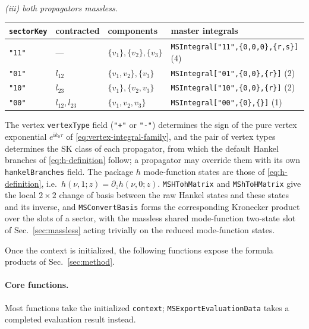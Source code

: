 \documentclass[11pt,a4paper]{article}
\newcommand{\ii}{\mathrm i}
\begin{document}
\begin{center}
\emph{(iii) both propagators massless.}\\[2pt]
\footnotesize\begin{tabular}{@{}lllp{5.8cm}@{}}
\toprule
\texttt{sectorKey} & contracted & components & master integrals\\
\midrule
\texttt{"11"} & --- & $\{v_1\},\{v_2\},\{v_3\}$
  & \texttt{MSIntegral["11",\{0,0,0\},\{r,s\}]} (4)\\
\texttt{"01"} & $l_{12}$ & $\{v_1,v_2\},\{v_3\}$
  & \texttt{MSIntegral["01",\{0,0\},\{r\}]} (2)\\
\texttt{"10"} & $l_{23}$ & $\{v_1\},\{v_2,v_3\}$
  & \texttt{MSIntegral["10",\{0,0\},\{r\}]} (2)\\
\texttt{"00"} & $l_{12},l_{23}$ & $\{v_1,v_2,v_3\}$
  & \texttt{MSIntegral["00",\{0\},\{\}]} (1)\\
\bottomrule
\end{tabular}
\end{center}


The vertex \texttt{vertexType} field (\texttt{"+"} or \texttt{"-"}) determines the sign of the pure
vertex exponential $e^{\ii k_0\tau}$ of \eqref{eq:vertex-integral-family}, and the pair of vertex types determines the SK class of each propagator, from which the default Hankel branches of
\eqref{eq:h-definition} follow; a propagator may override them with its own \texttt{hankelBranches}
field. The
package $h$ mode-function states are those of \eqref{eq:h-definition}, i.e.\
$h(\nu,1;z)=\partial_zh(\nu,0;z)$. \texttt{MSHTohMatrix} and \texttt{MShToHMatrix} give the local
$2\times2$ change of basis between the raw Hankel states and these states and its inverse, and
\texttt{MSConvertBasis} forms the corresponding Kronecker product over the slots of a sector, with the
massless shared mode-function two-state slot of Sec.~\ref{sec:massless} acting trivially on the reduced
mode-function states.



Once the context is initialized, the following functions expose the formula products of Sec.~\ref{sec:method}.

\paragraph{Core functions.}
\label{sec:core}

Most functions take the initialized \texttt{context};
\texttt{MSExportEvaluationData} takes a completed evaluation result instead.
\end{document}
